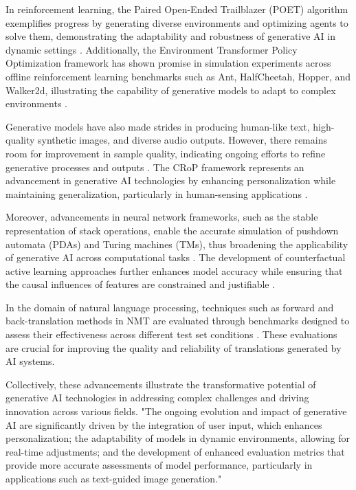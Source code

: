 In reinforcement learning, the Paired Open-Ended Trailblazer (POET) algorithm exemplifies progress by generating diverse environments and optimizing agents to solve them, demonstrating the adaptability and robustness of generative AI in dynamic settings \cite{wang2019pairedopenendedtrailblazerpoet}. Additionally, the Environment Transformer Policy Optimization framework has shown promise in simulation experiments across offline reinforcement learning benchmarks such as Ant, HalfCheetah, Hopper, and Walker2d, illustrating the capability of generative models to adapt to complex environments \cite{wang2023environmenttransformerpolicyoptimization}.



Generative models have also made strides in producing human-like text, high-quality synthetic images, and diverse audio outputs. However, there remains room for improvement in sample quality, indicating ongoing efforts to refine generative processes and outputs \cite{dhariwal2021diffusion}. The CRoP framework represents an advancement in generative AI technologies by enhancing personalization while maintaining generalization, particularly in human-sensing applications \cite{kaur2024cropcontextwiserobuststatic}.



Moreover, advancements in neural network frameworks, such as the stable representation of stack operations, enable the accurate simulation of pushdown automata (PDAs) and Turing machines (TMs), thus broadening the applicability of generative AI across computational tasks \cite{stogin2022provablystableneuralnetwork}. The development of counterfactual active learning approaches further enhances model accuracy while ensuring that the causal influences of features are constrained and justifiable \cite{sen2018supervisingfeatureinfluence}.



In the domain of natural language processing, techniques such as forward and back-translation methods in NMT are evaluated through benchmarks designed to assess their effectiveness across different test set conditions \cite{bogoychev2020domaintranslationesenoisesynthetic}. These evaluations are crucial for improving the quality and reliability of translations generated by AI systems.



Collectively, these advancements illustrate the transformative potential of generative AI technologies in addressing complex challenges and driving innovation across various fields. "The ongoing evolution and impact of generative AI are significantly driven by the integration of user input, which enhances personalization; the adaptability of models in dynamic environments, allowing for real-time adjustments; and the development of enhanced evaluation metrics that provide more accurate assessments of model performance, particularly in applications such as text-guided image generation." \cite{palmini2024patternscreativityuserinput}




